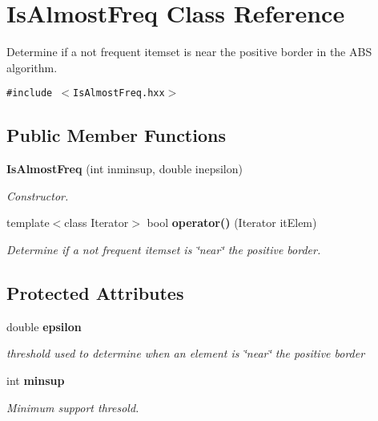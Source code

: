 \section{Is\-Almost\-Freq Class Reference}
\label{class_is_almost_freq}
Determine if a not frequent itemset is near the positive border in the ABS algorithm.  


{\tt \#include $<$Is\-Almost\-Freq.hxx$>$}

\subsection*{Public Member Functions}
\begin{CompactItemize}
\item 
{\bf Is\-Almost\-Freq} (int inminsup, double inepsilon)\label{class_is_almost_freq_7103fd70890d938354573f4daec7e0ec}

\begin{CompactList}\small\item\em Constructor. \item\end{CompactList}\item 
template$<$class Iterator$>$ bool {\bf operator()} (Iterator it\-Elem)
\begin{CompactList}\small\item\em Determine if a not frequent itemset is \char`\"{}near\char`\"{} the positive border. \item\end{CompactList}\end{CompactItemize}
\subsection*{Protected Attributes}
\begin{CompactItemize}
\item 
double {\bf epsilon}\label{class_is_almost_freq_b6f988eaf3645c85e54dfc34e7461e64}

\begin{CompactList}\small\item\em threshold used to determine when an element is \char`\"{}near\char`\"{} the positive border \item\end{CompactList}\item 
int {\bf minsup}\label{class_is_almost_freq_94fe99251edd3b41cb4d1c6a231bd452}

\begin{CompactList}\small\item\em Minimum support thresold. \item\end{CompactList}\end{CompactItemize}


